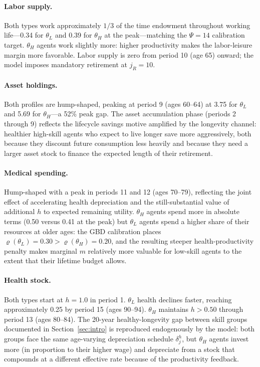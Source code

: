 \documentclass[12pt,a4paper]{article}
\begin{document}
\paragraph{Labor supply.} Both types work approximately $1/3$ of the
time endowment throughout working life---0.34 for $\theta_{L}$ and
0.39 for $\theta_{H}$ at the peak---matching the
$\Psi = 14$ calibration target. $\theta_{H}$ agents work slightly
more: higher productivity makes the labor-leisure margin more
favorable. Labor supply is zero from period 10 (age 65) onward; the
model imposes mandatory retirement at $j_{R} = 10$.

\paragraph{Asset holdings.} Both profiles are hump-shaped, peaking
at period 9 (ages 60--64) at 3.75 for $\theta_{L}$ and 5.69 for
$\theta_{H}$---a 52\% peak gap. The asset accumulation phase
(periods 2 through 9) reflects the lifecycle savings motive amplified
by the longevity channel: healthier high-skill agents who expect to
live longer save more aggressively, both because they discount future
consumption less heavily and because they need a larger asset stock
to finance the expected length of their retirement.

\paragraph{Medical spending.} Hump-shaped with a peak in periods 11
and 12 (ages 70--79), reflecting the joint effect of accelerating
health depreciation and the still-substantial value of additional
$h$ to expected remaining utility. $\theta_{H}$ agents spend more in
absolute terms (0.50 versus 0.41 at the peak) but $\theta_{L}$ agents
spend a higher share of their resources at older ages: the GBD
calibration places $\varrho(\theta_{L}) = 0.30 > \varrho(\theta_{H}) = 0.20$,
and the resulting steeper health-productivity penalty makes marginal
$m$ relatively more valuable for low-skill agents to the extent that
their lifetime budget allows.

\paragraph{Health stock.} Both types start at $h = 1.0$ in period 1.
$\theta_{L}$ health declines faster, reaching approximately 0.25 by
period 15 (ages 90--94). $\theta_{H}$ maintains $h > 0.50$ through
period 13 (ages 80--84). The 20-year healthy-longevity gap between
skill groups documented in Section~\ref{sec:intro} is reproduced
endogenously by the model: both groups face the same age-varying
depreciation schedule $\delta^{h}_{j}$, but $\theta_{H}$ agents
invest more (in proportion to their higher wage) and depreciate from
a stock that compounds at a different effective rate because of the
productivity feedback.
\end{document}
